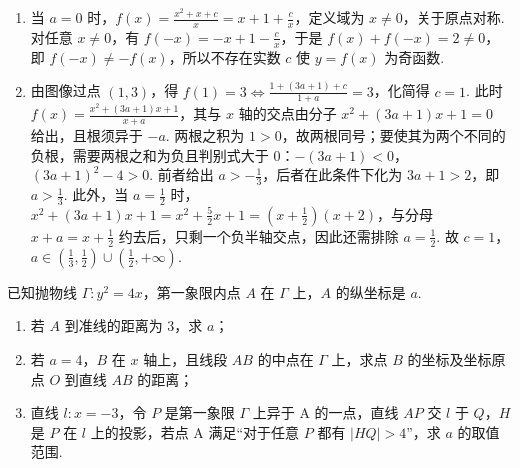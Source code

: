 \begin{solution}
\begin{enumerate}
\item 当 \(a=0\) 时，\(f(x)=\frac{x^2+x+c}{x}=x+1+\frac{c}{x}\)，定义域为 \(x\ne 0\)，关于原点对称. 对任意 \(x\ne 0\)，有 \(f(-x)=-x+1-\frac{c}{x}\)，于是 \(f(x)+f(-x)=2\ne 0\)，即 \(f(-x)\ne -f(x)\)，所以不存在实数 \(c\) 使 \(y=f(x)\) 为奇函数.

\item 由图像过点 \((1,3)\)，得 \(f(1)=3\iff \frac{1+(3a+1)+c}{1+a}=3\)，化简得 \(c=1\).
此时 \(f(x)=\frac{x^2+(3a+1)x+1}{x+a}\)，其与 \(x\) 轴的交点由分子 \(x^2+(3a+1)x+1=0\) 给出，且根须异于 \(-a\). 两根之积为 \(1>0\)，故两根同号；要使其为两个不同的负根，需要两根之和为负且判别式大于 \(0\)：\(-(3a+1)<0\)，\((3a+1)^2-4>0\).
前者给出 \(a>-\frac13\)，后者在此条件下化为 \(3a+1>2\)，即 \(a>\frac13\).
此外，当 \(a=\frac12\) 时，\(x^2+\left(3a+1\right)x+1=x^2+\frac52x+1=\left(x+\frac12\right)\left(x+2\right)\)，与分母 \(x+a=x+\frac12\) 约去后，只剩一个负半轴交点，因此还需排除 \(a=\frac12\).
故 \(c=1\)，\(a\in\left(\frac13,\frac12\right)\cup\left(\frac12,+\infty\right)\).
\end{enumerate}
\end{solution}

\begin{problem}
已知抛物线 \(\Gamma:y^2=4x\)，第一象限内点 \(A\) 在 \(\Gamma\) 上，\(A\) 的纵坐标是 \(a\).
\begin{enumerate}
\item 若 \(A\) 到准线的距离为 \(3\)，求 \(a\)；
\item 若 \(a=4\)，\(B\) 在 \(x\) 轴上，且线段 \(AB\) 的中点在 \(\Gamma\) 上，求点 \(B\) 的坐标及坐标原点 \(O\) 到直线 \(AB\) 的距离；
\item 直线 \(l:x=-3\)，令 \(P\) 是第一象限 \(\Gamma\) 上异于 A 的一点，直线 \(AP\) 交 \(l\) 于 \(Q\)，\(H\) 是 \(P\) 在 \(l\) 上的投影，若点 A 满足“对于任意 \(P\) 都有 \(\left|HQ\right|>4\)”，求 \(a\) 的取值范围.
\end{enumerate}
\end{problem}

